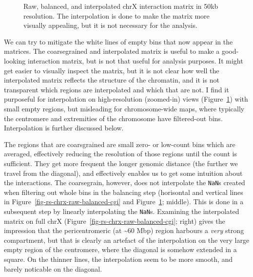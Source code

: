 \documentclass[
  11pt,
  a4paper,
]{scrbook}
\let\oldemph\emph
\renewcommand\emph[1]{\oldemph{\color{gray}#1}}
\begin{document}
\begin{figure}[H]


\caption{\label{fig-rs-chrx-raw-balanced-cgi-subset}Raw, balanced, and
interpolated chrX interaction matrix in 50kb resolution. The
interpolation is done to make the matrix more visually appealing, but it
is not necessary for the analysis.}

\end{figure}%

We can try to mitigate the white lines of empty bins that now appear in
the matrices. The coarsegrained and interpolated matrix is useful to
make a good-looking interaction matrix, but is not that useful for
analysis purposes. It might get easier to visually inspect the matrix,
but it is not clear how well the interpolated matrix reflects the
structure of the chromatin, and it is not transparent which regions are
interpolated and which that are not. I find it purposeful for
interpolation on high-resolution (zoomed-in) views
(Figure~\ref{fig-rs-chrx-raw-balanced-cgi-subset}) with small empty
regions, but misleading for chromosome-wide maps, where typically the
centromere and extremities of the chromosome have filtered-out bins.
Interpolation is further discussed below.

The regions that are coarsgrained are small zero- or low-count bins
which are averaged, effectively reducing the resolution of those regions
until the count is sufficient. They get more frequent the longer genomic
distance (the further we travel from the diagonal), and effectively
enables us to get some intuition about the interactions. The
coarsegrain, however, does not interpolate the \texttt{NaN}s created
when filtering out whole bins in the balancing step (horisontal and
vertical lines in Figure~\ref{fig-rs-chrx-raw-balanced-cgi} and
Figure~\ref{fig-rs-chrx-raw-balanced-cgi-subset}; middle). This is done
in a subsequent step by linearly interpolating the \texttt{NaN}s.
Examining the interpolated matrix on full chrX
(Figure~\ref{fig-rs-chrx-raw-balanced-cgi}; right) gives the impression
that the pericentromeric (at \textasciitilde60 Mbp) region harbours a
\emph{very} strong compartment, but that is clearly an artefact of the
interpolation on the very large empty region of the centromere, where
the diagonal is somehow extended in a square. On the thinner lines, the
interpolation seem to be more smooth, and barely noticable on the
diagonal.
\end{document}
